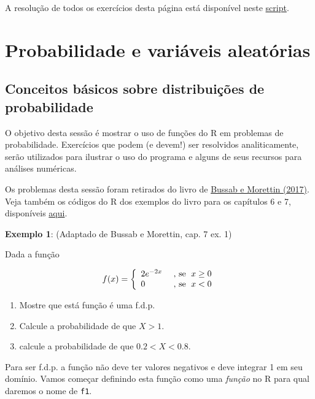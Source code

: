 \documentclass[
  10pt,
  a4paper]{book}
\providecommand{\tightlist}{%
  \setlength{\itemsep}{0pt}\setlength{\parskip}{0pt}}
\begin{document}
A resolução de todos os exercícios desta página está disponível neste
\href{scripts/analise-exploratoria-exercicios.R}{script}.

\hypertarget{probabilidade-e-variuxe1veis-aleatuxf3rias}{%
\chapter{Probabilidade e variáveis aleatórias}\label{probabilidade-e-variuxe1veis-aleatuxf3rias}}

\hypertarget{conceitos-buxe1sicos-sobre-distribuiuxe7uxf5es-de-probabilidade}{%
\section{Conceitos básicos sobre distribuições de probabilidade}\label{conceitos-buxe1sicos-sobre-distribuiuxe7uxf5es-de-probabilidade}}

O objetivo desta sessão é mostrar o uso de funções do R em problemas de
probabilidade. Exercícios que podem (e devem!) ser resolvidos
analiticamente, serão utilizados para ilustrar o uso do programa e
alguns de seus recursos para análises numéricas.

Os problemas desta sessão foram retirados do livro de \href{https://www.ime.usp.br/~pam/EstBas.html}{Bussab e Morettin
(2017)}. Veja também os códigos
do R dos exemplos do livro para os capítulos 6 e 7, disponíveis
\href{https://rpubs.com/EstatBasica/Introd}{aqui}.

\textbf{Exemplo 1}: (Adaptado de Bussab e Morettin, cap. 7 ex. 1)

Dada a função

\[
\
  f(x) = \left\{ \begin{array}{ll}
      2 e^{-2x} & \mbox{ , se $ \; x \geq 0$} \cr
      0   & \mbox{ , se  $ \; x < 0$}
    \end{array} \right.
\
\]

\begin{enumerate}
\def\labelenumi{\alph{enumi}.}
\tightlist
\item
  Mostre que está função é uma f.d.p.
\item
  Calcule a probabilidade de que \(X > 1\).
\item
  calcule a probabilidade de que \(0.2 < X < 0.8\).
\end{enumerate}

Para ser f.d.p. a função não deve ter valores negativos e deve integrar
1 em seu domínio. Vamos começar definindo esta função como uma \emph{função}
no R para qual daremos o nome de \texttt{f1}.
\end{document}

